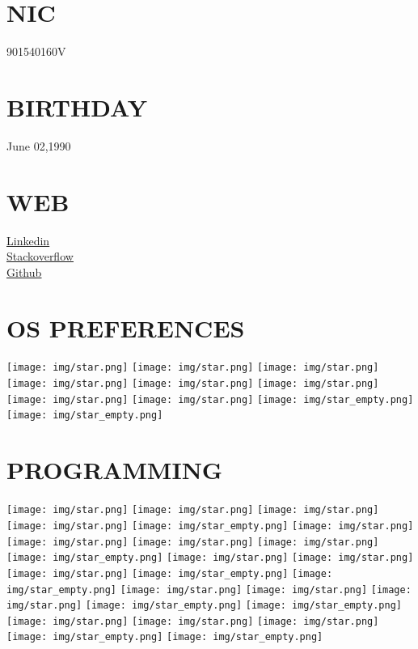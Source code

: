 \documentclass[]{cv-class}
\begin{document}
\begin{aside}
  \section{NIC}
  	{\whitebodyfont 901540160V}
    ~
  \section{BIRTHDAY}
  	{\whitebodyfont June 02,1990}
    ~   
  \section{WEB}
  	\vspace{0.10cm}
    \underline{\href{https://www.linkedin.com/in/janithamadushan}{{\whitebodyfont Linkedin}}}
    \\
	\vspace{0.10cm}
    \underline{\href{https://stackoverflow.com/story/jmadushan}{{\whitebodyfont Stackoverflow}}}
	\\	
	\vspace{0.10cm}
    \underline{\href{https://github.com/janitham}{{\whitebodyfont Github}}}
    ~
  \section{OS PREFERENCES}
    {\texttt{[image: img/star.png]}
    \texttt{[image: img/star.png]}
    \texttt{[image: img/star.png]}
    \texttt{[image: img/star.png]}
    \texttt{[image: img/star.png]}}
    {\texttt{[image: img/star.png]}
    \texttt{[image: img/star.png]}
    \texttt{[image: img/star.png]}
    \texttt{[image: img/star\_empty.png]}
    \texttt{[image: img/star\_empty.png]}}
    ~
  \section{PROGRAMMING}
    {\texttt{[image: img/star.png]}
    \texttt{[image: img/star.png]}
    \texttt{[image: img/star.png]}
    \texttt{[image: img/star.png]}
    \texttt{[image: img/star\_empty.png]}}
    {\texttt{[image: img/star.png]}
    \texttt{[image: img/star.png]}
    \texttt{[image: img/star.png]}
    \texttt{[image: img/star.png]}
    \texttt{[image: img/star\_empty.png]}}
    {\texttt{[image: img/star.png]}
    \texttt{[image: img/star.png]}
    \texttt{[image: img/star.png]}
    \texttt{[image: img/star\_empty.png]}
    \texttt{[image: img/star\_empty.png]}}
    {\texttt{[image: img/star.png]}
    \texttt{[image: img/star.png]}
    \texttt{[image: img/star.png]}
    \texttt{[image: img/star\_empty.png]}
    \texttt{[image: img/star\_empty.png]}}
    {\texttt{[image: img/star.png]}
    \texttt{[image: img/star.png]}
    \texttt{[image: img/star.png]}
    \texttt{[image: img/star\_empty.png]}
    \texttt{[image: img/star\_empty.png]}}
    ~
\end{aside}
\end{document}
